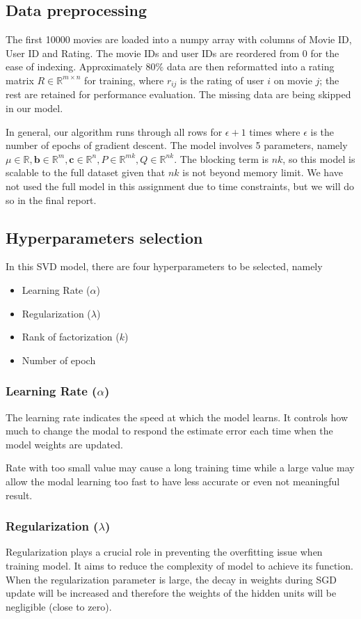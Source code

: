 \documentclass[final]{cvpr}
\begin{document}
\subsection{Data preprocessing}
The first 10000 movies are loaded into a numpy array with columns of Movie ID, User ID and Rating.
The movie IDs and user IDs are reordered from 0 for the ease of indexing.
Approximately $80\%$ data are then reformatted into a rating matrix $R \in \mathbb R^{m \times n}$ for training,
where $r_{ij}$ is the rating of user $i$ on movie $j$;
the rest are retained for performance evaluation.
The missing data are being skipped in our model.

In general, our algorithm runs through all rows for $\epsilon+1$ times
where $\epsilon$ is the number of epochs of gradient descent.
The model involves 5 parameters,
namely $\mu \in \mathbb R, \mathbf b \in \mathbb R^m, \mathbf c \in \mathbb R^n, P \in \mathbb R^{mk}, Q \in \mathbb R^{nk}$.
The blocking term is $nk$, so this model is scalable to the full dataset given that $nk$ is not beyond memory limit.
We have not used the full model in this assignment due to time constraints,
but we will do so in the final report.

\subsection{Hyperparameters selection}
In this SVD model, there are four hyperparameters to be selected, namely
\begin{itemize}
	\item Learning Rate ($\alpha$)
	\item Regularization ($\lambda$)
	\item Rank of factorization ($k$)
	\item Number of epoch
\end{itemize}

\subsubsection{Learning Rate ($\alpha$)}
The learning rate indicates the speed at which the model learns. It controls how much to change the modal to respond the estimate error each time when the model weights are updated.

Rate with too small value may cause a long training time while a large value may allow the modal learning too fast to have less accurate or even not meaningful result.

\subsubsection{Regularization ($\lambda$)}
Regularization plays a crucial role in preventing the overfitting issue when training model. It aims to reduce the complexity of model to achieve its function. When the regularization parameter is large, the decay in weights during SGD update will be increased and therefore the weights of the hidden units will be negligible (close to zero).
\end{document}
